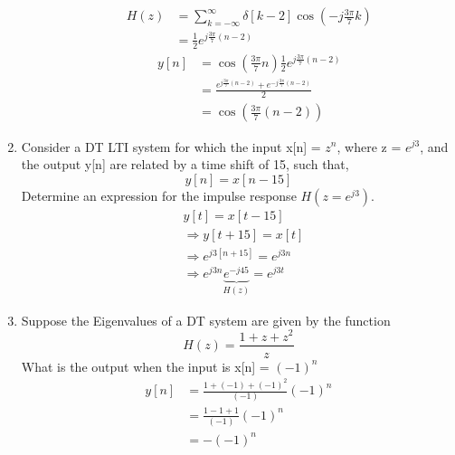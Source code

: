\documentclass{article}
\begin{document}
\begin{enumerate}
\begin{enumerate}
\begin{align}
            H(z) &= \sum_{k=-\infty}^\infty \delta[k-2]\cos(-j\frac{3\pi}{7}k)\\
            &= \frac{1}{2}e^{j\frac{3\pi}{7}(n-2)}
        \end{align}
        \begin{align}
            y[n] &= \cos(\frac{3\pi}{7}n)\frac{1}{2}e^{j\frac{3\pi}{7}(n-2)}\\
            &= \frac{e^{j\frac{3\pi}{7}(n-2)}+e^{-j\frac{3\pi}{7}(n-2)}}{2}\\
            &= \boxed{\cos(\frac{3\pi}{7}(n-2))}
        \end{align}
    \end{enumerate}
    \newpage
    \item Consider a DT LTI system for which the input x[n] = $z^n$, where z = $e^{j3}$, and the output y[n] are related by a time shift of 15, such that,
    \begin{equation}
        y[n] = x[n-15]
    \end{equation}
    Determine an expression for the impulse response $H(z=e^{j3})$.
    \begin{align}
        &y[t] = x[t-15]\\
        &\Rightarrow y[t+15] = x[t]\\
        &\Rightarrow e^{j3[n+15]} = e^{j3n}\\
        &\Rightarrow e^{j3n}\underbrace{\boxed{e^{-j45}}}_{H(z)} = e^{j3t}
    \end{align}
    \newpage
    \item Suppose the Eigenvalues of a DT system are given by the function
    \begin{equation}
        H(z) = \frac{1+z+z^2}{z}
    \end{equation}
    What is the output when the input is x[n] = $(-1)^n$
    \begin{align}
        y[n] &= \frac{1+(-1)+(-1)^2}{(-1)}(-1)^n\\
        &= \frac{1-1+1}{(-1)}(-1)^n\\
        &= \boxed {-(-1)^n}\\
    \end{align}
\end{enumerate}
\end{document}
